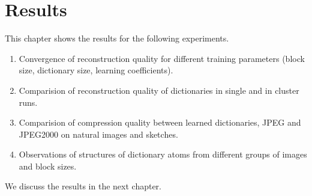 \chapter{Results}
This chapter shows the results for the following experiments.
\begin{enumerate}
 \item Convergence of reconstruction quality for different training parameters
(block size, dictionary size, learning coefficients).
 \item Comparision of reconstruction quality of dictionaries
in single and in cluster runs. 
 \item Comparision of compression quality between learned dictionaries, JPEG and
JPEG2000  on natural images and sketches.
 \item Observations of structures of dictionary atoms from different
groups of images and block sizes.
\end{enumerate}

We discuss the results in the next chapter.

\newpage

